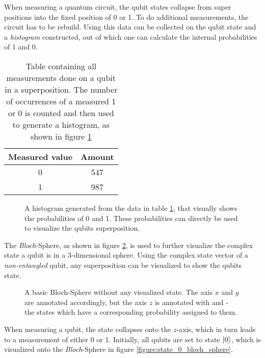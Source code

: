 When measuring a quantum circuit, the qubit states collapse from super positions into the fixed position of 0 or 1. To do additional measurements, the circuit has to be rebuild. Using this data can be collected on the qubit state and a \emph{histogram} constructed, out of which one can calculate the internal probabilities of 1 and 0.

\begin{table}[!h]
    \centering
    \begin{tabular}{|c|c|}
         Measured value & Amount  \\
         \hline
         0 & 547 \\
         1 & 987 \\
    \end{tabular}
    \caption{Table containing all measurements done on a qubit in a superposition. The number of occurrences of a measured 1 or 0 is counted and then used to generate a histogram, as shown in figure \ref{figure:example_histogram}}
    \label{table:example_counts}
\end{table}



\begin{figure}[!h]
    \centering
    \scalebox{0.75}{
        
    }
    \caption{A histogram generated from the data in table \ref{table:example_counts}, that visually shows the probabilities of 0 and 1. These probabilities can directly be used to visualize the qubits superposition.}
    \label{figure:example_histogram}
\end{figure}

The \emph{Bloch}-Sphere, as shown in figure \ref{figure:basic_bloch_sphere}, is used to further visualize the complex state a qubit is in a 3-dimensional sphere. Using the complex state vector of a \emph{non-entangled} qubit, any superposition can be visualized to show the qubits state.

\begin{figure}[!h]
    \centering
    \scalebox{0.75}{
        
    }
    \caption{A basic Bloch-Sphere without any visualized state. The axis $x$ and $y$ are annotated accordingly, but the axis $z$ is annotated with  and  - the states which have a corresponding probability assigned to them.}
    \label{figure:basic_bloch_sphere}
\end{figure}

When measuring a qubit, the state collapses onto the $z$-axis\cite{}, which in turn leads to a measurement of either 0 or 1. Initially, all qubits are set to state $\ket{0}$, which is visualized onto the \emph{Bloch}-Sphere in figure \ref{figure:state_0_bloch_sphere}.

